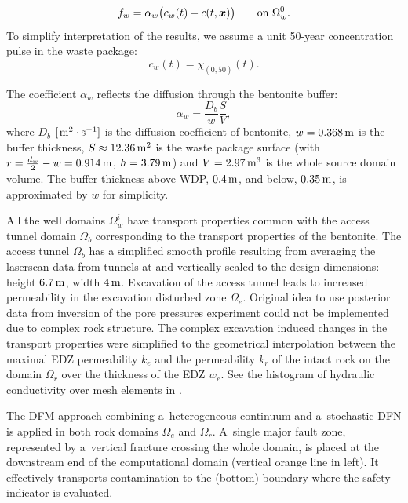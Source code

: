 \begin{equation}
\label{eq:pulse_source}
    f_w = \alpha_w\big(c_w(t) - c(t, {\bm{x}})\big)
    \qquad \text{on $\Omega_w^0$}.
\end{equation}
To simplify interpretation of the results, we assume a
unit 50-year concentration pulse in the waste package:
\[
c_w(t) = \chi_{(0,50)}(t).
\]

The coefficient $\alpha_w$ reflects the diffusion through the bentonite buffer:
\[
 \alpha_w = \frac{D_b}{ w}\frac{S}{V},
\]
where $D_b$ $[\hspace{1pt}\mathrm{m^2\cdot s^{-1}}]$ is the diffusion coefficient of
bentonite, $w=0.368\,\mathrm{{m}}$ is the buffer thickness,
$S\approx 12.36 \,\mathrm{m}^2$ is the waste package surface
(with $r=\frac{d_w}{2} - w=0.914\,\mathrm{m}$,
$h=3.79\,\mathrm{m}$) and $V=2.97\,\mathrm{m^3}$
is the whole source domain volume.
The buffer thickness above \gls{WDP}, $0.4\,\mathrm{m}$, and below,
$0.35\,\mathrm{m}$, is approximated by $w$ for simplicity.




 All the well domains  $\Omega_w^i$ have transport properties common with the
access tunnel domain $\Omega_b$ corresponding to the transport properties of
the bentonite. The access tunnel $\Omega_b$ has a simplified smooth profile
resulting from averaging the laserscan data from tunnels at \URFB
and vertically scaled to the design dimensions: height $6.7\,\mathrm{m}$, width
$4\,\mathrm{m}$. Excavation of the access tunnel leads to increased permeability
in the excavation disturbed zone $\Omega_e$. Original idea to use posterior
data from inversion of the pore pressures experiment could not be implemented
due to complex rock structure. The complex excavation induced changes in the
transport properties were simplified to the geometrical interpolation between
the maximal EDZ permeability $k_e$ and the permeability $k_r$ of the intact
rock on the domain $\Omega_r$ over the thickness of the EDZ $w_e$. See the
histogram of hydraulic conductivity over mesh elements in
. 

The \Gls{DFM} approach combining
a~heterogeneous continuum and a~stochastic \Gls{DFN} is applied in both rock
domains $\Omega_e$ and $\Omega_r$. A~single major fault zone, represented by
a~vertical fracture crossing the whole domain, is placed at the downstream end
of the computational domain (vertical orange line in 
left). It effectively transports contamination to the (bottom) boundary where
the safety indicator is evaluated.

